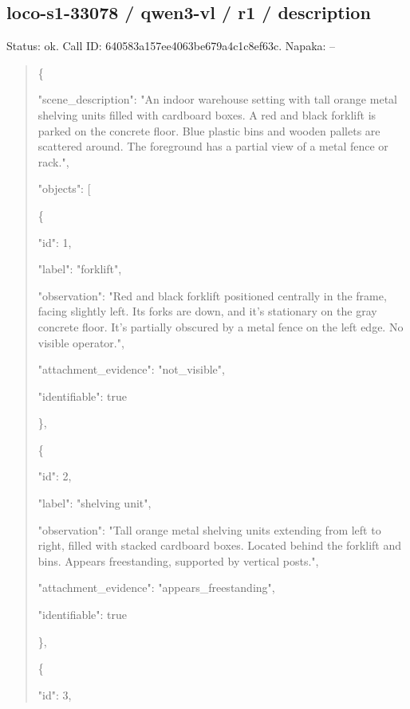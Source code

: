 \documentclass[10pt,a4paper]{article}
\begin{document}
\subsection*{loco-s1-33078 / qwen3-vl / r1 / description}
Status: ok. Call ID: 640583a157ee4063be679a4c1c8ef63c. Napaka: --
\begin{quote}\footnotesize
\{\par
  "scene\_description":\allowbreak{} "An indoor warehouse setting with tall orange metal shelving units filled with cardboard boxes. A red and black forklift is parked on the concrete floor. Blue plastic bins and wooden pallets are scattered around. The foreground has a partial view of a metal fence or rack.",\allowbreak{}\par
  "objects":\allowbreak{} [\par
    \{\par
      "id":\allowbreak{} 1,\allowbreak{}\par
      "label":\allowbreak{} "forklift",\allowbreak{}\par
      "observation":\allowbreak{} "Red and black forklift positioned centrally in the frame,\allowbreak{} facing slightly left. Its forks are down,\allowbreak{} and it's stationary on the gray concrete floor. It's partially obscured by a metal fence on the left edge. No visible operator.",\allowbreak{}\par
      "attachment\_evidence":\allowbreak{} "not\_visible",\allowbreak{}\par
      "identifiable":\allowbreak{} true\par
    \},\allowbreak{}\par
    \{\par
      "id":\allowbreak{} 2,\allowbreak{}\par
      "label":\allowbreak{} "shelving unit",\allowbreak{}\par
      "observation":\allowbreak{} "Tall orange metal shelving units extending from left to right,\allowbreak{} filled with stacked cardboard boxes. Located behind the forklift and bins. Appears freestanding,\allowbreak{} supported by vertical posts.",\allowbreak{}\par
      "attachment\_evidence":\allowbreak{} "appears\_freestanding",\allowbreak{}\par
      "identifiable":\allowbreak{} true\par
    \},\allowbreak{}\par
    \{\par
      "id":\allowbreak{} 3,\allowbreak{}\par

\end{quote}
\end{document}

